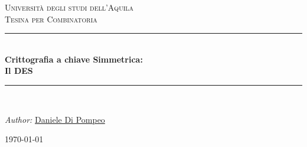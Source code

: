 \documentclass[11pt, a4paper, oneside]{Thesis} %
\title{\ttitle} %
\begin{document}
\frontmatter %


\fancyhead{} %
\rhead{\thepage} %
\lhead{} %

\pagestyle{fancy} %

\newcommand{\HRule}{\rule{\linewidth}{0.5mm}} %

\hypersetup{pdfsubject=\subjectname}
\hypersetup{pdfauthor=\authornames}
\hypersetup{pdfkeywords=\keywordnames}


\begin{titlepage}
\begin{center}

\textsc{\LARGE Università degli studi dell'Aquila}\\[1.5cm] %
\textsc{\Large Tesina per Combinatoria }\\[0.5cm] %

\HRule \\[0.4cm] %
{\huge \bfseries Crittografia a chiave Simmetrica:\\[0.6cm] Il DES}\\[0.4cm] %
\HRule \\[1.5cm] %
 
\begin{minipage}{1\textwidth}
\begin{flushleft} \large
\emph{Author: }\href{}{Daniele Di Pompeo} %
\end{flushleft}
\end{minipage}
 
{\large \today}\\[4cm] %
 
\vfill
\end{center}

\end{titlepage}
\end{document}
